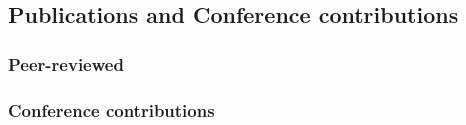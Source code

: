 \documentclass[
11pt, %
english, %
singlespacing, %
headsepline, %
]{MastersDoctoralThesis} %
\begin{document}
\begin{NoHyper}
\printnoidxglossary[type=acronym]
\printacronyms[title={List of Abbreviations}]


%
%
%
%



\chapter{Publications and Conference contributions} %

\label{chp:publications}
\subsection{Peer-reviewed}

\begin{refsection}
	\begin{refcontext}[sorting=ydnt]
		\nocite{*}
		\printbibliography[heading=none]
	\end{refcontext}
\end{refsection}


\subsection{Conference contributions}

\begin{refsection}
	\begin{refcontext}[sorting=ydnt]
		\nocite{*}
		\printbibliography[heading=none]
	\end{refcontext}
\end{refsection}
%


\end{NoHyper}
\end{document}
